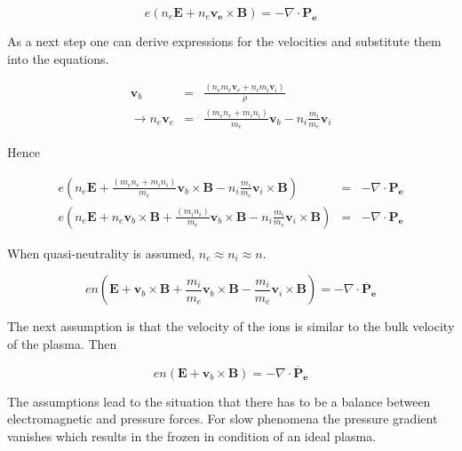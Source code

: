 \documentclass[a4paper,11pt]{thesis}
\begin{document}
\begin{equation}
        e  \left( n_e \mathbf{E}+ n_e \mathbf{v_e}\times
     \mathbf{B}\right) = -\nabla \cdot \mathbf{P_e}
\end{equation}

As a next step one can derive expressions for the velocities and substitute them into the equations.

\begin{eqnarray}
    \mathbf{v}_b&=&\frac{(n_e m_e \mathbf{v}_e +n_i m_i
    \mathbf{v}_i)}{\rho}\\
    \rightarrow n_e  \mathbf{v}_e &=& \frac{(m_en_e +m_i n_i)}{m_e} \mathbf{v}_b-n_i \frac{m_i}{m_e}
    \mathbf{v}_i
\end{eqnarray}

Hence

\begin{eqnarray}
        e  \left( n_e \mathbf{E}+ \frac{(m_en_e +m_i n_i)}{m_e} \mathbf{v}_b \times
     \mathbf{B}-n_i \frac{m_i}{m_e}
    \mathbf{v}_i\times
     \mathbf{B}\right) &=& -\nabla \cdot \mathbf{P_e}\nonumber \\
      e  \left( n_e \mathbf{E}+ n_e \mathbf{v}_b \times
     \mathbf{B}  +\frac{(m_i n_i)}{m_e} \mathbf{v}_b \times
     \mathbf{B}-n_i \frac{m_i}{m_e}
    \mathbf{v}_i\times
     \mathbf{B}\right) &=& -\nabla \cdot \mathbf{P_e}\nonumber
\end{eqnarray}

When quasi-neutrality is assumed, $n_e\approx n_i\approx n$.

\begin{equation}
    e  n \left(  \mathbf{E}+  \mathbf{v}_b \times \mathbf{B}  +\frac{m_i }{m_e} \mathbf{v}_b \times
     \mathbf{B}- \frac{m_i}{m_e} \mathbf{v}_i \times \mathbf{B} \right) = -\nabla \cdot \mathbf{\overline{P}_e}
\end{equation}

The next assumption is that the velocity of the ions is similar to
the bulk velocity of the plasma. Then

\begin{equation}
    e  n \left(  \mathbf{E}+  \mathbf{v}_b \times \mathbf{B}  \right) = -\nabla \cdot \mathbf{\overline{P}_e}
\end{equation}

The assumptions lead to the situation that there has to be a balance between electromagnetic and pressure
forces. For slow phenomena the pressure gradient vanishes which
results in the frozen in condition of an ideal plasma.
\end{document}
